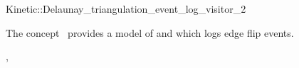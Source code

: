 

\begin{ccRefClass}{Kinetic::Delaunay_triangulation_event_log_visitor_2}


\ccDefinition
  
The concept \ccRefName\ provides a model of
 and  which logs edge flip events.


\ccIsModel

, 

\ccSeeAlso



\end{ccRefClass}


